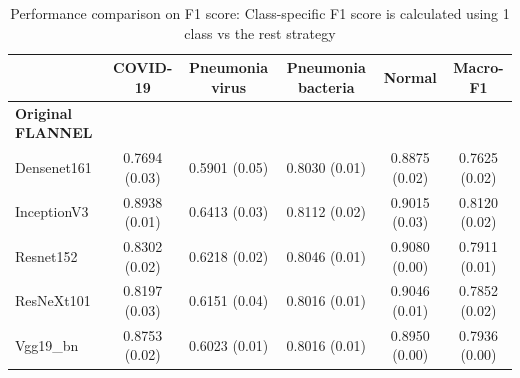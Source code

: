 \documentclass{sigkddExp}
\begin{document}
\begin{table}
    \centering
    \caption{Performance comparison on F1 score: Class-specific F1 score is calculated using 1 class vs the rest strategy}
    \label{table:resultstats}
    \begin{tabular}{ |lccccc| } \hline
                                  & COVID-19      & Pneumonia virus & Pneumonia bacteria &
        Normal                    & Macro-F1                                               \\ \hline
        \textbf{Original FLANNEL} &               &                 &                    &
                                  &                                                        \\
        Densenet161               & 0.7694 (0.03) & 0.5901 (0.05)   & 0.8030 (0.01)      &
        0.8875 (0.02)             & 0.7625 (0.02)                                          \\
        InceptionV3               & 0.8938 (0.01) & 0.6413 (0.03)   & 0.8112 (0.02)      &
        0.9015 (0.03)             & 0.8120 (0.02)                                          \\
        Resnet152                 & 0.8302 (0.02) & 0.6218 (0.02)   & 0.8046 (0.01)      &
        0.9080 (0.00)             & 0.7911 (0.01)                                          \\
        ResNeXt101                & 0.8197 (0.03) & 0.6151 (0.04)   & 0.8016 (0.01)      &
        0.9046 (0.01)             & 0.7852 (0.02)                                          \\
        Vgg19\_bn                 & 0.8753 (0.02) & 0.6023 (0.01)   & 0.8016 (0.01)      &
        0.8950 (0.00)             & 0.7936 (0.00)                                          \\


\end{tabular}
\end{table}
\end{document}
